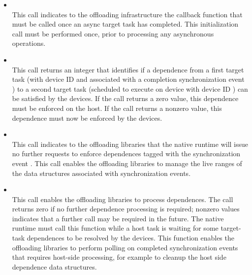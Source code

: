 \begin{itemize}
  \item {} \\
  
  This call indicates to the offloading infrastructure the callback function that must be called once an async target task has completed. This initialization call must be performed once, prior to processing any asynchronous operations.
  
  \item {} \\
  
  This call returns an integer that identifies if a dependence from a first target task (with device ID  and associated with a completion synchronization event ) to a second target task (scheduled to execute on device with device ID ) can be satisfied by the devices. If the call returns a zero value, this dependence must be enforced on the host. If the call returns a nonzero value, this dependence must now be enforced by the devices.
    
  \item {} \\
  
  This call indicates to the offloading libraries that the native runtime will issue no further requests to enforce dependences tagged with the synchronization event . This call enables the offloading libraries to manage the live ranges of the data structures associated with synchronization events. 
  
  \item {} \\
  
 This call enables the offloading libraries to process dependences. The call returns zero if no further dependence processing is required; nonzero values indicates that a further call may be required in the future. The native runtime must call this function while a host task is waiting for some target-task dependences to be resolved by the devices. This function enables the offloading libraries to perform polling on completed synchronization events that requires host-side processing, for example to cleanup the host side dependence data structures. 
 \end{itemize}
  
